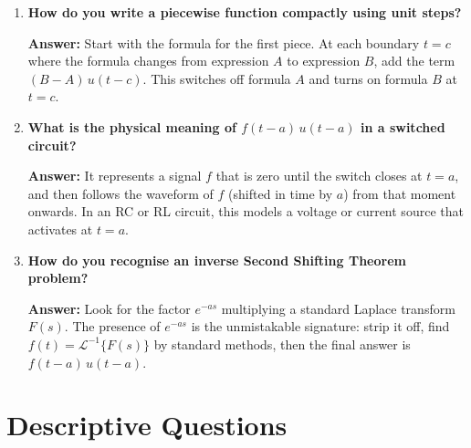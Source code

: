 \documentclass[12pt,a4paper]{article}
\begin{document}
\begin{enumerate}[label=\textbf{Q\arabic*.}]
\item \textbf{How do you write a piecewise function compactly using unit steps?}

  \textbf{Answer:}
  Start with the formula for the first piece.
  At each boundary $t = c$ where the formula changes from expression $A$ to expression $B$,
  add the term $(B - A)\,u(t-c)$.
  This switches off formula $A$ and turns on formula $B$ at $t = c$.

\item \textbf{What is the physical meaning of $f(t-a)\,u(t-a)$ in a switched circuit?}

  \textbf{Answer:}
  It represents a signal $f$ that is zero until the switch closes at $t = a$, and then
  follows the waveform of $f$ (shifted in time by $a$) from that moment onwards.
  In an RC or RL circuit, this models a voltage or current source that activates at $t = a$.

\item \textbf{How do you recognise an inverse Second Shifting Theorem problem?}

  \textbf{Answer:}
  Look for the factor $e^{-as}$ multiplying a standard Laplace transform $F(s)$.
  The presence of $e^{-as}$ is the unmistakable signature: strip it off, find
  $f(t) = \mathcal{L}^{-1}\{F(s)\}$ by standard methods, then the final answer is
  $f(t-a)\,u(t-a)$.

\end{enumerate}

\section{Descriptive Questions}
\end{document}
